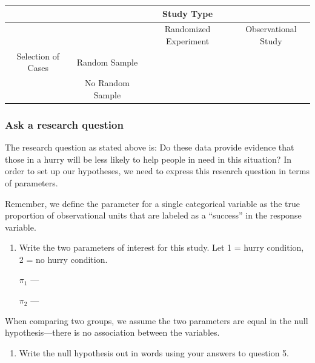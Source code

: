\documentclass[
]{report}
\providecommand{\tightlist}{%
  \setlength{\itemsep}{0pt}\setlength{\parskip}{0pt}}
\begin{document}
\begin{center}
\begin{tabular}{|c|c|c|c|}\hline
& & Study Type & \\ \hline
& & Randomized Experiment & Observational Study \\ \hline
Selection of Cases & Random Sample &  &  \\ \hline
& No Random Sample & & \\ \hline
\end{tabular}
\end{center}


\hypertarget{ask-a-research-question-1}{%
\subsubsection*{Ask a research question}\label{ask-a-research-question-1}}

The research question as stated above is: Do these data provide evidence that those in a hurry will be less likely to help people in need in this situation? In order to set up our hypotheses, we need to express this research question in terms of parameters.

Remember, we define the parameter for a single categorical variable as the true proportion of observational units that are labeled as a ``success'' in the response variable.

\newpage

\begin{enumerate}
\def\labelenumi{\arabic{enumi}.}
\setcounter{enumi}{4}
\item
  Write the two parameters of interest for this study. Let 1 = hurry condition, 2 = no hurry condition.
  \vspace{1mm}

  \(\pi_1\) ---
  \vspace{0.5in}

  \(\pi_2\) ---
  \vspace{0.5in}
\end{enumerate}

When comparing two groups, we assume the two parameters are equal in the null hypothesis---there is no association between the variables.

\begin{enumerate}
\def\labelenumi{\arabic{enumi}.}
\setcounter{enumi}{5}
\tightlist
\item
  Write the null hypothesis out in words using your answers to question 5.
\end{enumerate}
\end{document}
